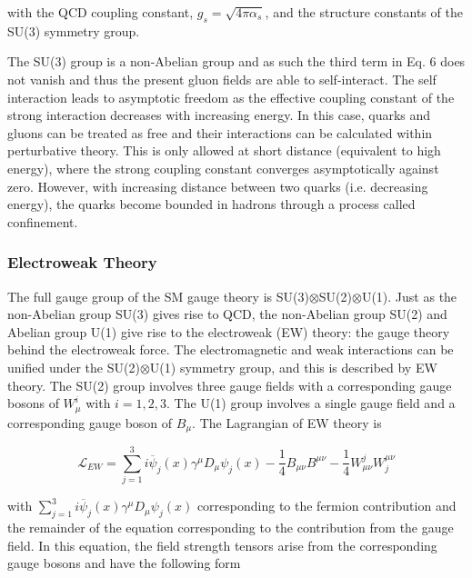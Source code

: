 \documentclass[12pt,a4paper,epsf,portrait,times,epsfig]{article}
\begin{document}
		with the QCD coupling constant, $g_{s} = \sqrt{4\pi\alpha_{s}}$, and the structure constants of the SU(3) symmetry group. \par 
		The SU(3) group is a non-Abelian group and as such the third term in Eq. 6 does not vanish and thus the present gluon fields are able to self-interact. The self interaction leads to asymptotic freedom as the effective coupling constant of the strong interaction decreases with increasing energy. In this case, quarks and gluons can be treated as free and their interactions can be calculated within perturbative theory. This is only allowed at short distance (equivalent to high energy), where the strong coupling constant converges asymptotically against zero. However, with increasing distance between two quarks (i.e. decreasing energy), the quarks become bounded in hadrons through a process called confinement.
		
		\subsubsection{Electroweak Theory} 
		
		The full gauge group of the SM gauge theory is SU(3)$\otimes$SU(2)$\otimes$U(1). Just as the non-Abelian group SU(3) gives rise to QCD, the non-Abelian group SU(2) and Abelian group U(1) give rise to the electroweak (EW) theory: the gauge theory behind the electroweak force. The electromagnetic and weak interactions can be unified under the SU(2)$\otimes$U(1) symmetry group, and this is described by EW theory. The SU(2) group involves three gauge fields with a corresponding gauge bosons of $W_{\mu}^{i}$ with $i = 1, 2, 3$. The U(1) group involves a single gauge field and a corresponding gauge boson of $B_{\mu}$. The Lagrangian of EW theory is
		
		\begin{center}
			\begin{equation}
				\mathcal{L}_{EW} = \sum_{j=1}^{3}i\overline{\psi}_{j}(x)\gamma^{\mu}D_{\mu}\psi_{j}(x)-\frac{1}{4}B_{\mu\nu}B^{\mu\nu}-\frac{1}{4}W_{\mu\nu}^{j}W_{j}^{\mu\nu}
			\end{equation}
		\end{center}
		
		with $\sum_{j=1}^{3}i\overline{\psi}_{j}(x)\gamma^{\mu}D_{\mu}\psi_{j}(x)$ corresponding to the fermion contribution and the remainder of the equation corresponding to the contribution from the gauge field. In this equation, the field strength tensors arise from the corresponding gauge bosons and have the following form
		
\end{document}
